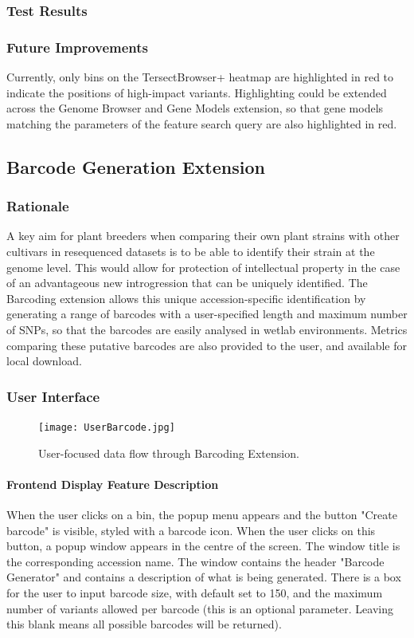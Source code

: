 \documentclass[12pt]{article}
\begin{document}
\begin{itemize}
\subsubsection{Test Results}

\subsubsection{Future Improvements}
Currently, only bins on the TersectBrowser+ heatmap are highlighted in red to indicate the positions of high-impact variants. Highlighting could be extended across the Genome Browser and Gene Models extension, so that gene models matching the parameters of the feature search query are also highlighted in red.


\subsection{Barcode Generation Extension}
\subsubsection{Rationale}
A key aim for plant breeders when comparing their own plant strains with other cultivars in resequenced datasets is to be able to identify their strain at the genome level. This would allow for protection of intellectual property in the case of an advantageous new introgression that can be uniquely identified. The Barcoding extension allows this unique accession-specific identification by generating a range of barcodes with a user-specified length and maximum number of SNPs, so that the barcodes are easily analysed in wetlab environments. Metrics comparing these putative barcodes are also provided to the user, and available for local download. 

\subsubsection{User Interface}

\begin{figure}[h]
    \centering
    \texttt{[image: UserBarcode.jpg]}
    \caption{User-focused data flow through Barcoding Extension.}
\end{figure}
\paragraph{Frontend Display Feature Description}
When the user clicks on a bin, the popup menu appears and the button "Create barcode" is visible, styled with a barcode icon. When the user clicks on this button, a popup window appears in the centre of the screen. The window title is the corresponding accession name. The window contains the header "Barcode Generator" and contains a description of what is being generated. There is a box for the user to input barcode size, with default set to 150, and the maximum number of variants allowed per barcode (this is an optional parameter. Leaving this blank means all possible barcodes will be returned).  


\end{itemize}
\end{document}
